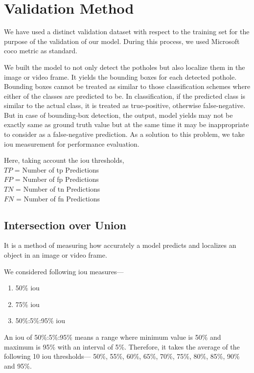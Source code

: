     \section{Validation Method}
        We have used a distinct validation dataset with respect to the training set for the purpose of the validation of our model.
        During this process, we used Microsoft \acrshort{coco} metric as standard.
        
        We built the model to not only detect the potholes but also localize them in the image or video frame. It yields the bounding boxes for each detected pothole. Bounding boxes cannot be treated as similar to those classification schemes where either of the classes are predicted to be. In classification, if the predicted class is similar to the actual class, it is treated as true-positive, otherwise false-negative. But in case of bounding-box detection, the output, model yields may not be exactly same as ground truth value but at the same time it may be inappropriate to consider as a false-negative prediction. As a solution to this problem, we take \acrfull{iou} measurement for performance evaluation.
            
        Here, taking account the \acrshort{iou} thresholds, \\
        $TP$ = Number of \acrlong{tp} Predictions \\
        $FP$ = Number of \acrlong{fp} Predictions \\
        $TN$ = Number of \acrlong{tn} Predictions \\
        $FN$ = Number of \acrlong{fn} Predictions
        
        \subsection{Intersection over Union}
            It is a method of measuring how accurately a model predicts and localizes an object in an image or video frame.
            
            We considered following \acrshort{iou} measures---
            \begin{enumerate}
            \item 50\% \acrshort{iou}
            \item 75\% \acrshort{iou}
            \item 50\%:5\%:95\% \acrshort{iou}
            \end{enumerate}
            An \acrshort{iou} of 50\%:5\%:95\% means a range where minimum value is 50\% and maximum is 95\% with an interval of 5\%. Therefore, it takes the average of the following 10 \acrshort{iou} thresholds--- 50\%, 55\%, 60\%, 65\%, 70\%, 75\%, 80\%, 85\%, 90\% and 95\%.
            
